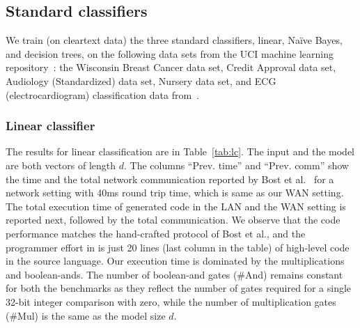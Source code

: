 \subsection{Standard classifiers}
\label{sec:shallow}
We train (on cleartext data) the three standard classifiers, linear, Na\"{i}ve Bayes, and
decision trees, on the following data sets from the UCI
machine learning repository~\cite{uci}:
 the Wisconsin Breast Cancer data set, 
Credit Approval data set, Audiology (Standardized) data set, Nursery
data set, and ECG (electrocardiogram) classification data
from~\cite{barni}.

\subsubsection*{Linear classifier}The results for linear
classification are in Table~\ref{tab:lc}. The
input and the model are both vectors of length $d$. The columns
``Prev. time'' and ``Prev. comm'' show the time and the total
network communication reported by Bost et al.~\cite{shafindss} for a
network setting with 40ms
round trip time, which is same as our WAN setting. The total execution
time
of \tool generated code in the LAN and the WAN setting is reported
next, followed by the total communication.
We observe that the \tool code performance matches the hand-crafted protocol of Bost
et al., and the programmer effort in \tool is just 20
lines (last column in the table) of high-level code in the \tool
source language. %
 Our execution time is dominated by the multiplications and
boolean-ands.
The number of boolean-and gates (\#And) remains constant for both the
benchmarks as they reflect the number of gates required for a
single 32-bit integer comparison with zero, while the number of
multiplication gates (\#Mul) is the same as the model size $d$.

